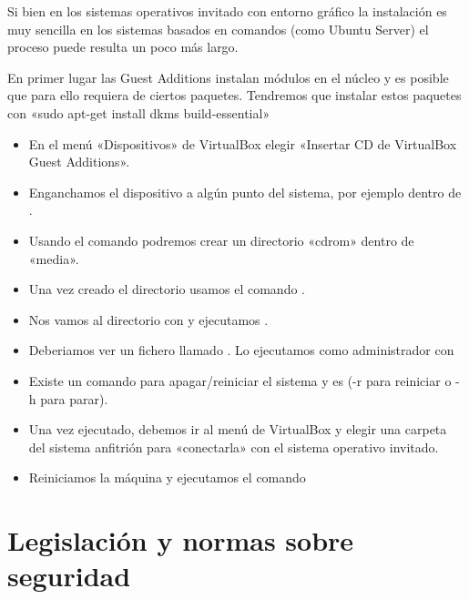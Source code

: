 \documentclass[letterpaper,10pt,spanish]{sphinxmanual}
\begin{document}
Si bien en los sistemas operativos invitado con entorno gráfico la instalación es muy sencilla en los sistemas basados en comandos (como Ubuntu Server) el proceso puede resulta un poco más largo.

En primer lugar las Guest Additions instalan módulos en el núcleo y es posible que para ello requiera de ciertos paquetes. Tendremos que instalar estos paquetes con «sudo apt-get install dkms build-essential»
\begin{itemize}
\item {} 
En el menú «Dispositivos» de VirtualBox elegir «Insertar CD de VirtualBox Guest Additions».

\item {} 
Enganchamos el dispositivo  a algún punto del sistema, por ejemplo dentro de  .

\item {} 
Usando el comando  podremos crear un directorio «cdrom» dentro de «media».

\item {} 
Una vez creado el directorio usamos el comando  .

\item {} 
Nos vamos al directorio con   y ejecutamos  .

\item {} 
Deberiamos ver un fichero llamado  . Lo ejecutamos como administrador con 

\item {} 
Existe un comando para apagar/reiniciar el sistema y es  (-r para reiniciar o -h para parar).

\item {} 
Una vez ejecutado, debemos ir al menú de VirtualBox y elegir una carpeta del sistema anfitrión para «conectarla» con el sistema operativo invitado.

\item {} 
Reiniciamos la máquina y ejecutamos el comando 

\end{itemize}


\chapter{Legislación y normas sobre seguridad}
\label{\detokenize{tema_lopd/tema_lopd:legislacion-y-normas-sobre-seguridad}}\label{\detokenize{tema_lopd/tema_lopd::doc}}
\end{document}

